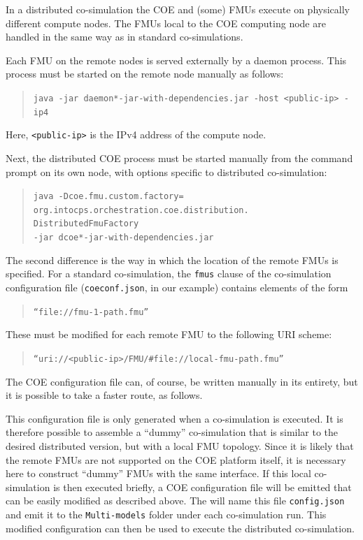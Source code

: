 In a distributed co-simulation the COE and (some) FMUs execute on physically different compute nodes.
%
The FMUs local to the COE computing node are handled in the same way as in standard co-simulations.

Each FMU on the remote nodes is served externally by a daemon process.
%
This process must be started on the remote node manually as follows:
%
%
%
\begin{quote}
\texttt{java -jar daemon*-jar-with-dependencies.jar -host <public-ip> -ip4}
\end{quote}
%
%
%
Here, \texttt{<public-ip>} is the IPv4 address of the compute node.

Next, the distributed COE process must be started manually from the command prompt on its own node, with options specific to distributed co-simulation:
%
%
%
\begin{quote}
\texttt{java -Dcoe.fmu.custom.factory=\\ org.intocps.orchestration.coe.distribution.\\DistributedFmuFactory \\ -jar dcoe*-jar-with-dependencies.jar}
\end{quote}
%
%
%
The second difference is the way in which the location of the remote FMUs is specified.
%
For a standard co-simulation, the \texttt{fmus} clause of the co-simulation configuration file (\texttt{coeconf.json}, in our example) contains elements of the form
%
%
%
\begin{quote}
\texttt{``file://fmu-1-path.fmu''}
\end{quote}
%
%
%
These must be modified for each remote FMU to the following URI scheme:
%
%
%
\begin{quote}
\texttt{``uri://<public-ip>/FMU/\#file://local-fmu-path.fmu''}
\end{quote}
%
%
%
The COE configuration file can, of course, be written manually in its entirety, but it is possible to take a faster route, as follows.

This configuration file is only generated when a co-simulation is executed.
%
It is therefore possible to assemble a ``dummy'' co-simulation that is similar to the desired distributed version, but with a local FMU topology.
%
Since it is likely that the remote FMUs are not supported on the COE platform itself, it is necessary here to construct ``dummy'' FMUs with the same interface.
%
If this local co-simulation is then executed briefly, a COE configuration file will be emitted that can be easily modified as described above.
%
The \intoapp{} will name this file \texttt{config.json} and emit it to the \texttt{Multi-models} folder under each co-simulation run.
%
This modified configuration can then be used to execute the distributed co-simulation.

